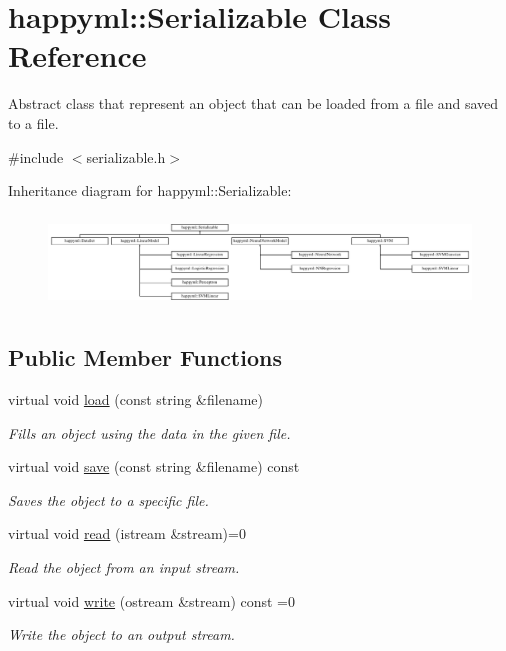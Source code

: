 \hypertarget{classhappyml_1_1Serializable}{}\section{happyml\+:\+:Serializable Class Reference}
\label{classhappyml_1_1Serializable}


Abstract class that represent an object that can be loaded from a file and saved to a file.  




{\ttfamily \#include $<$serializable.\+h$>$}

Inheritance diagram for happyml\+:\+:Serializable\+:\begin{figure}[H]
\begin{center}
\leavevmode
\includegraphics[height=2.500000cm]{classhappyml_1_1Serializable}
\end{center}
\end{figure}
\subsection*{Public Member Functions}
\begin{DoxyCompactItemize}
\item 
virtual void \hyperlink{classhappyml_1_1Serializable_a839f14e831098c5c9ffd1ce149df71b3}{load} (const string \&filename)
\begin{DoxyCompactList}\small\item\em Fills an object using the data in the given file. \end{DoxyCompactList}\item 
virtual void \hyperlink{classhappyml_1_1Serializable_a06a0a44a24b1c800115875b44d07cff9}{save} (const string \&filename) const 
\begin{DoxyCompactList}\small\item\em Saves the object to a specific file. \end{DoxyCompactList}\item 
virtual void \hyperlink{classhappyml_1_1Serializable_aef5c211d8e9c1c425b33c657824c2f0c}{read} (istream \&stream)=0
\begin{DoxyCompactList}\small\item\em Read the object from an input stream. \end{DoxyCompactList}\item 
virtual void \hyperlink{classhappyml_1_1Serializable_a2d503e4c2e39c5be8a33bcc8b691949f}{write} (ostream \&stream) const  =0
\begin{DoxyCompactList}\small\item\em Write the object to an output stream. \end{DoxyCompactList}\end{DoxyCompactItemize}


